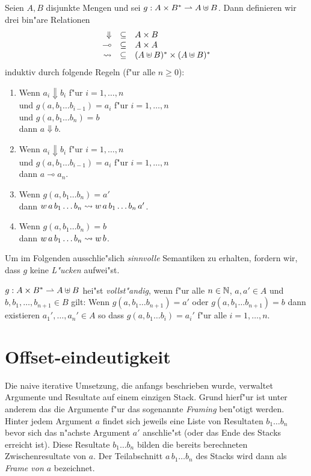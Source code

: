 \documentclass[12pt,a4paper]{article}
\begin{document}
Seien $A,B$ disjunkte Mengen und sei $g: A \times B^* \rightharpoonup A \uplus B$. Dann definieren wir
drei bin"are Relationen
\[\begin{array}{rcl}
  \Downarrow & \subseteq & A \times B \\
  \multimap  & \subseteq & A \times A \\
  \rightsquigarrow      & \subseteq & (A \uplus B)^* \times (A \uplus B)^*
\end{array}\]
induktiv durch folgende Regeln (f"ur alle $n \ge 0$):
\begin{enumerate}
\item Wenn $a_i \Downarrow b_i$ f"ur $i=1,\ldots,n$ \\
  und $g(a,b_1 \ldots b_{i-1}) = a_i$ f"ur $i = 1,\ldots,n$ \\
  und $g(a,b_1 \ldots b_n) = b$ \\
  dann $a \Downarrow b$.
\item Wenn $a_i \Downarrow b_i$ f"ur $i=1,\ldots,n$ \\
  und $g(a,b_1 \ldots b_{i-1})=a_i$ f"ur $i=1,\ldots,n$ \\
  dann $a \multimap a_n$.
\item Wenn $g(a,b_1 \ldots b_n) = a'$ \\
  dann $w\,a\,b_1 \ldots b_n \rightsquigarrow w\,a\,b_1 \ldots b_n\,a'$.
\item Wenn $g(a,b_1 \ldots b_n) = b$ \\
  dann $w\,a\,b_1 \ldots b_n \rightsquigarrow w\,b$.
\end{enumerate}
Um im Folgenden ausschlie"slich \emph{sinnvolle} Semantiken zu erhalten, fordern wir, dass $g$
keine \emph{L"ucken} aufwei"st.
\begin{definition}
  $g: A \times B^* \rightharpoonup A \uplus B$ hei"st \emph{vollst"andig}, wenn f"ur alle $n \in \mathbb N$, $a,a'\in A$
  und $b,b_1,\ldots,b_{n+1} \in B$ gilt: 
  Wenn $g(a,b_1 \ldots b_{n+1}) = a'$ oder $g(a,b_1 \ldots b_{n+1}) = b$ dann
  existieren $a_1',\ldots,a_n' \in A$ so dass $g(a,b_1 \ldots b_i) = a_i'$ f"ur alle $i = 1,\ldots,n$.
\end{definition}


\section{Offset-eindeutigkeit}

Die naive iterative Umsetzung, die anfangs beschrieben wurde, verwaltet Argumente und Resultate auf einem einzigen
Stack. Grund hierf"ur ist unter anderem das die Argumente f"ur das sogenannte \emph{Framing} ben"otigt werden.
Hinter jedem Argument $a$ findet sich jeweils eine Liste von Resultaten $b_1 \ldots b_n$ bevor sich das n"achste
Argument $a'$ anschlie"st (oder das Ende des Stacks erreicht ist). Diese Resultate $b_1 \ldots b_n$ bilden die
bereits berechneten Zwischenresultate von $a$. Der Teilabschnitt $a\,b_1 \ldots b_n$ des Stacks wird dann als
\emph{Frame von $a$} bezeichnet.
\end{document}
